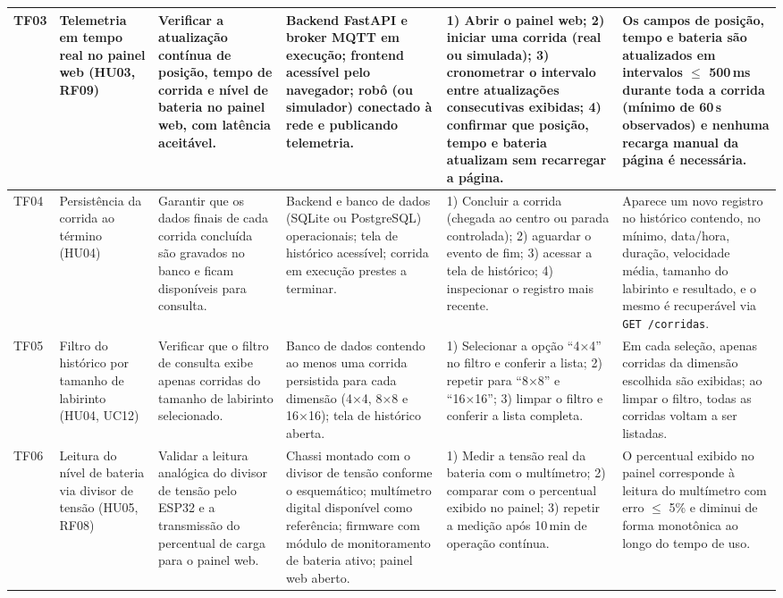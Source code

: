 \begin{apendicesenv}
\begin{landscape}
\begin{small}
\begin{longtable}{|p{1.2cm}|p{3cm}|p{3.5cm}|p{4cm}|p{5.5cm}|p{4cm}|}
    TF03 & Telemetria em tempo real no painel web (HU03, RF09) &
    Verificar a atualização contínua de posição, tempo de corrida e nível de bateria no painel web, com latência aceitável. &
    Backend FastAPI e broker MQTT em execução; frontend acessível pelo navegador; robô (ou simulador) conectado à rede e publicando telemetria. &
    1) Abrir o painel web; 2) iniciar uma corrida (real ou simulada); 3) cronometrar o intervalo entre atualizações consecutivas exibidas; 4) confirmar que posição, tempo e bateria atualizam sem recarregar a página. &
    Os campos de posição, tempo e bateria são atualizados em intervalos $\leq$ 500\,ms durante toda a corrida (mínimo de 60\,s observados) e nenhuma recarga manual da página é necessária. \\ \hline

    TF04 & Persistência da corrida ao término (HU04) &
    Garantir que os dados finais de cada corrida concluída são gravados no banco e ficam disponíveis para consulta. &
    Backend e banco de dados (SQLite ou PostgreSQL) operacionais; tela de histórico acessível; corrida em execução prestes a terminar. &
    1) Concluir a corrida (chegada ao centro ou parada controlada); 2) aguardar o evento de fim; 3) acessar a tela de histórico; 4) inspecionar o registro mais recente. &
    Aparece um novo registro no histórico contendo, no mínimo, data/hora, duração, velocidade média, tamanho do labirinto e resultado, e o mesmo é recuperável via \texttt{GET /corridas}. \\ \hline

    TF05 & Filtro do histórico por tamanho de labirinto (HU04, UC12) &
    Verificar que o filtro de consulta exibe apenas corridas do tamanho de labirinto selecionado. &
    Banco de dados contendo ao menos uma corrida persistida para cada dimensão (4×4, 8×8 e 16×16); tela de histórico aberta. &
    1) Selecionar a opção ``4×4'' no filtro e conferir a lista; 2) repetir para ``8×8'' e ``16×16''; 3) limpar o filtro e conferir a lista completa. &
    Em cada seleção, apenas corridas da dimensão escolhida são exibidas; ao limpar o filtro, todas as corridas voltam a ser listadas. \\ \hline

    TF06 & Leitura do nível de bateria via divisor de tensão (HU05, RF08) &
    Validar a leitura analógica do divisor de tensão pelo ESP32 e a transmissão do percentual de carga para o painel web. &
    Chassi montado com o divisor de tensão conforme o esquemático; multímetro digital disponível como referência; firmware com módulo de monitoramento de bateria ativo; painel web aberto. &
    1) Medir a tensão real da bateria com o multímetro; 2) comparar com o percentual exibido no painel; 3) repetir a medição após 10\,min de operação contínua. &
    O percentual exibido no painel corresponde à leitura do multímetro com erro $\leq$ 5\% e diminui de forma monotônica ao longo do tempo de uso. \\ \hline


\end{longtable}
\end{small}
\end{landscape}
\end{apendicesenv}
